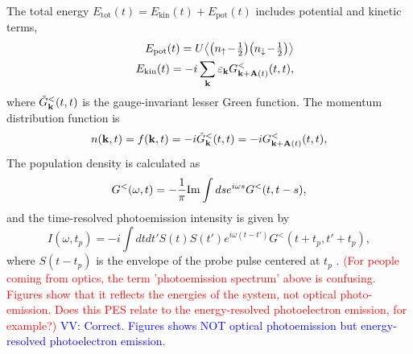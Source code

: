 \documentclass[prb,aps,twocolumn,showpacs,amsmath,amssymb]{revtex4}%
\begin{document}
The total energy $E_\text{tot}(t) = E_\text{kin}(t) + E_\text{pot}(t)$ includes potential  and
 kinetic  terms, 
\begin{eqnarray}
 &&E_\text{pot}(t) = 
    U \big\langle \big(n_{\uparrow}\!-\!\tfrac12\big)
    \big(n_{\downarrow}\!-\!\tfrac12\big) \big\rangle 
  \label{Epot}
\\
 &&E_\text{kin}(t) = 
  -i \sum_{\bf{k}}{\varepsilon_{\bf{k}}{{G}_{{\bf k}+{{\bf A}(t)}}^{<}}(t, t)},
      \label{Ekin}
\end{eqnarray}
where ${{\tilde G}_{\bf k}^{<}(t,t)}$  is the gauge-invariant \cite{Naoto08} lesser Green function. 
The momentum distribution function is
\begin{equation}
 n({\bf k},t)=f({\bf k},t)=-i{{\tilde G}_{\bf k}^{<}(t,t)}=-i{{G}_{{\bf k}+{{\bf A}(t)}}^{<}(t,t)},
\label{Distr}
\end{equation}
The population density is calculated as
\begin{equation}
G^{<}(\omega,t) = -\frac{1}{\pi}{\rm Im}\int ds e^{i\omega s}G^{<}(t,t-s),
\label{Gles}
\end{equation}
and the time-resolved photoemission intensity is 
given by 
\begin{equation}
\label{PES}
I(\omega,t_p)=-i\int dtdt'S(t)S(t')e^{i\omega(t-t')}G^{<}(t+t_p,t'+t_p),
\end{equation}
where $S(t-t_p)$ is the envelope of the 
probe pulse centered at $t_p$ \cite{Randi_1}. 
\textcolor{red}{(For people coming from optics, 
the term 'photoemission spectrum' above is confusing. Figures
show that it reflects the energies of the system, not
optical photo-emission. Does this PES relate to the 
energy-resolved photoelectron emission, for example?)} \textcolor{blue}{VV: Correct. Figures shows NOT optical photoemission but energy-resolved photoelectron emission.}
\end{document}
